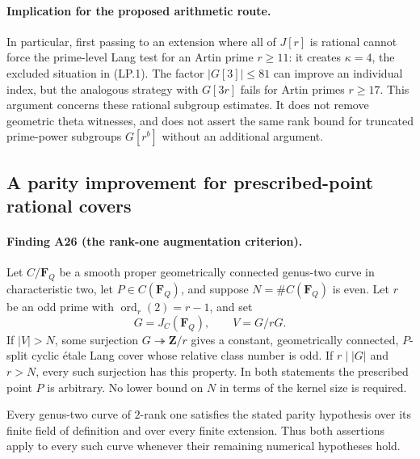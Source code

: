 \documentclass[11pt,a4paper]{article}
\begin{document}
\paragraph{Implication for the proposed arithmetic route.}
In particular, first passing to an extension where all of
$J[r]$ is rational cannot force the prime-level Lang test
for an Artin prime $r\ge11$: it creates $\kappa=4$, the
excluded situation in (LP.1).
The factor $|G[3]|\le81$ can improve an individual index,
but the analogous strategy with $G[3r]$ fails for Artin
primes $r\ge17$.
This argument concerns these rational subgroup estimates.
It does not remove geometric theta witnesses, and does not
assert the same rank bound for truncated prime-power
subgroups $G[r^b]$ without an additional argument.


\subsection{A parity improvement for prescribed-point rational covers}
\label{sec:rank-one-augmentation}

\paragraph{Finding A26 (the rank-one augmentation criterion).}
Let $C/\mathbf F_Q$ be a smooth proper geometrically connected
genus-two curve in characteristic two, let $P\in C(\mathbf F_Q)$,
and suppose $N=\#C(\mathbf F_Q)$ is even.
Let $r$ be an odd prime with $\operatorname{ord}_r(2)=r-1$, and set
\[
 G=J_C(\mathbf F_Q),\qquad V=G/rG.
\tag{RA.1}
\]
If $|V|>N$, some surjection $G\twoheadrightarrow\mathbf Z/r$
gives a constant, geometrically connected, $P$-split cyclic
\'etale Lang cover whose relative class number is odd.
If $r\mid|G|$ and $r>N$, every such surjection has this property.
In both statements the prescribed point $P$ is arbitrary.
No lower bound on $N$ in terms of the kernel size is required.

Every genus-two curve of $2$-rank one satisfies the stated
parity hypothesis over its finite field of definition and
over every finite extension.  Thus both assertions apply
to every such curve whenever their remaining numerical
hypotheses hold.
\end{document}
